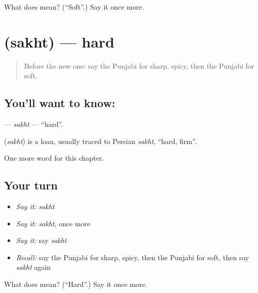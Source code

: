 \begin{tcolorbox}[breakable,colback=teal!4,colframe=teal!35!black,title={Before you move on}]
What does  mean? (\textquotedblleft{}Soft\textquotedblright{}.) Say it once more.
\end{tcolorbox}
\section[\texorpdfstring{\pa{ਸਖ਼ਤ} (sakht)}{ਸਖ਼ਤ (sakht)}]{ (sakht) — hard}

\label{lesson:PA-C144-sakht}



\begin{quote}
Before the new one: say the Punjabi for sharp, spicy, then the Punjabi for soft.
\end{quote}

\subsection*{You'll want to know: }
\textbf{} — \emph{sakht} — \textquotedblleft{}hard\textquotedblright{}.

\begin{cousinweb}
\textbf{} (\emph{sakht}) is a loan, usually traced to Persian \emph{sakht}, \textquotedblleft{}hard, firm\textquotedblright{}.
\end{cousinweb}

\begin{grammarlens}[title={What you've built}]
One more word for this chapter.
\end{grammarlens}

\subsection*{Your turn}
\begin{itemize}
\raggedright
  \item \emph{Say it:} \emph{sakht}
  \item \emph{Say it:} \emph{sakht}, once more
  \item \emph{Say it:} say \emph{sakht}
  \item \emph{Recall:} say the Punjabi for sharp, spicy, then the Punjabi for soft, then say \emph{sakht} again
\end{itemize}

\begin{tcolorbox}[breakable,colback=teal!4,colframe=teal!35!black,title={Before you move on}]
What does  mean? (\textquotedblleft{}Hard\textquotedblright{}.) Say it once more.
\end{tcolorbox}
